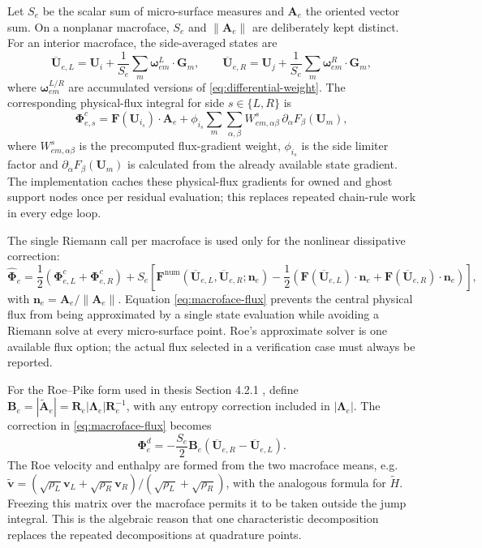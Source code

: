 \documentclass[11pt]{article}
\newcommand{\U}{\bm{U}}
\begin{document}
Let $S_e$ be the scalar sum of micro-surface measures and $\bm A_e$ the oriented vector sum.  On a nonplanar macroface, $S_e$ and $\|\bm A_e\|$ are deliberately kept distinct.  For an interior macroface, the side-averaged states are
\begin{equation}
 \overline{\U}_{e,L}=\U_i+\frac{1}{S_e}\sum_m\bm\omega^{L}_{em}\cdot\bm G_m,
 \qquad
 \overline{\U}_{e,R}=\U_j+\frac{1}{S_e}\sum_m\bm\omega^{R}_{em}\cdot\bm G_m,
 \label{eq:face-states}
\end{equation}
where $\bm\omega_{em}^{L/R}$ are accumulated versions of \eqref{eq:differential-weight}.  The corresponding physical-flux integral for side $s\in\{L,R\}$ is
\begin{equation}
 \bm\Phi^c_{e,s}=
 \bm F(\U_{i_s})\cdot\bm A_e+
 \phi_{i_s}\sum_m\sum_{\alpha,\beta}
 W^{s}_{em,\alpha\beta}\,
 \partial_\alpha F_\beta(\U_m),
 \label{eq:physical-flux-functional}
\end{equation}
where $W^{s}_{em,\alpha\beta}$ is the precomputed flux-gradient weight, $\phi_{i_s}$ is the side limiter factor and $\partial_\alpha F_\beta(\U_m)$ is calculated from the already available state gradient.  The implementation caches these physical-flux gradients for owned and ghost support nodes once per residual evaluation; this replaces repeated chain-rule work in every edge loop.

The single Riemann call per macroface is used only for the nonlinear dissipative correction:
\begin{equation}
 \widehat{\bm\Phi}_e =
 \frac{1}{2}\left(\bm\Phi^c_{e,L}+\bm\Phi^c_{e,R}\right)
 +S_e\left[
 \bm F^{\mathrm{num}}(\overline{\U}_{e,L},\overline{\U}_{e,R};\bm n_e)
 -\frac{1}{2}\left(
 \bm F(\overline{\U}_{e,L})\cdot\bm n_e+
 \bm F(\overline{\U}_{e,R})\cdot\bm n_e\right)
 \right],
 \label{eq:macroface-flux}
\end{equation}
with $\bm n_e=\bm A_e/\|\bm A_e\|$.  Equation \eqref{eq:macroface-flux} prevents the central physical flux from being approximated by a single state evaluation while avoiding a Riemann solve at every micro-surface point.  Roe's approximate solver \cite{roe1981} is one available flux option; the actual flux selected in a verification case must always be reported.

For the Roe--Pike form used in thesis Section 4.2.1 \cite{ma2026thesis}, define $\bm B_e=|\widetilde{\bm A}_e|=\bm R_e|\bm\Lambda_e|\bm R_e^{-1}$, with any entropy correction included in $|\bm\Lambda_e|$.  The correction in \eqref{eq:macroface-flux} becomes
\begin{equation}
 \bm\Phi^d_e=-\frac{S_e}{2}\bm B_e
       (\overline{\U}_{e,R}-\overline{\U}_{e,L}).
 \label{eq:frozen-roe}
\end{equation}
The Roe velocity and enthalpy are formed from the two macroface means, e.g.
$\widetilde{\bm v}=(\sqrt{\rho_L}\bm v_L+\sqrt{\rho_R}\bm v_R)/
(\sqrt{\rho_L}+\sqrt{\rho_R})$, with the analogous formula for $\widetilde H$.
Freezing this matrix over the macroface permits it to be taken outside the jump integral.  This is the algebraic reason that one characteristic decomposition replaces the repeated decompositions at quadrature points.
\end{document}
